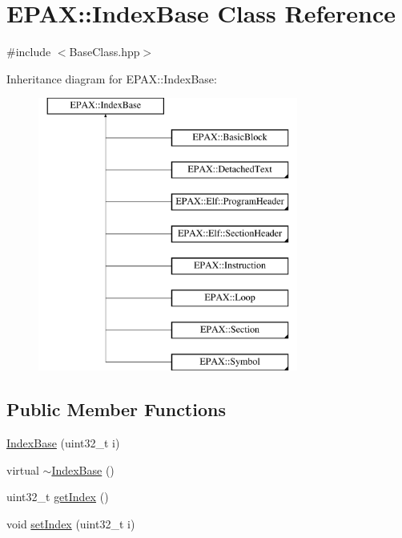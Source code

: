 \hypertarget{class_e_p_a_x_1_1_index_base}{\section{\-E\-P\-A\-X\-:\-:\-Index\-Base \-Class \-Reference}
\label{class_e_p_a_x_1_1_index_base}
}


{\ttfamily \#include $<$\-Base\-Class.\-hpp$>$}

\-Inheritance diagram for \-E\-P\-A\-X\-:\-:\-Index\-Base\-:\begin{figure}[H]
\begin{center}
\leavevmode
\includegraphics[height=9.000000cm]{class_e_p_a_x_1_1_index_base}
\end{center}
\end{figure}
\subsection*{\-Public \-Member \-Functions}
\begin{DoxyCompactItemize}
\item 
\hyperlink{class_e_p_a_x_1_1_index_base_a4b635a78fd95d44e733f41baf9c79220}{\-Index\-Base} (uint32\-\_\-t i)
\item 
virtual \hyperlink{class_e_p_a_x_1_1_index_base_aed5103698843436e247cfa6920c3677e}{$\sim$\-Index\-Base} ()
\item 
uint32\-\_\-t \hyperlink{class_e_p_a_x_1_1_index_base_a6115276ca197b32637ed030b7afdc58e}{get\-Index} ()
\item 
void \hyperlink{class_e_p_a_x_1_1_index_base_ae5b590c1e70d98d831c740b0eeca0cb8}{set\-Index} (uint32\-\_\-t i)
\end{DoxyCompactItemize}


